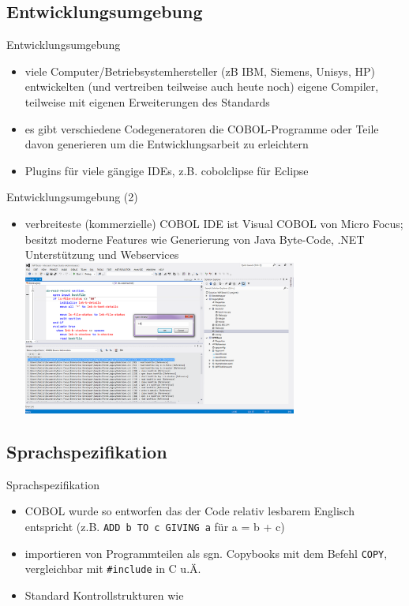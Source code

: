 \documentclass[handout]{beamer}
\begin{document}
\subsection{Entwicklungsumgebung}

\begin{frame}{Entwicklungsumgebung}
	\begin{itemize}
		\item
			viele Computer/Betriebsystemhersteller (zB IBM, Siemens, Unisys, HP) entwickelten (und vertreiben teilweise auch heute noch) eigene Compiler, teilweise mit eigenen Erweiterungen des Standards
		\item
			es gibt verschiedene Codegeneratoren die COBOL-Programme oder Teile davon generieren um die Entwicklungsarbeit zu erleichtern
		\item
			Plugins für viele gängige IDEs, z.B. cobolclipse für Eclipse
	\end{itemize}
\end{frame}

\begin{frame}{Entwicklungsumgebung (2)}
	\begin{itemize}			
		\item
			verbreiteste (kommerzielle) COBOL IDE ist Visual COBOL von Micro Focus; besitzt moderne Features wie Generierung von Java Byte-Code, .NET Unterstützung und Webservices
		\includegraphics[width=9cm]{VisualCOBOL2}
	\end{itemize}
\end{frame}

\subsection{Sprachspezifikation}

\begin{frame}{Sprachspezifikation}
	\begin{itemize}
		\item
			COBOL wurde so entworfen das der Code relativ lesbarem Englisch entspricht (z.B. \texttt{ADD b TO c GIVING a} f\"ur a = b + c)
		\item
			importieren von Programmteilen als sgn. Copybooks mit dem Befehl \texttt{COPY}, vergleichbar mit \texttt{\#include} in C u.\"A.
		\item
			Standard Kontrollstrukturen wie 
	\end{itemize}
\end{frame}
\end{document}
